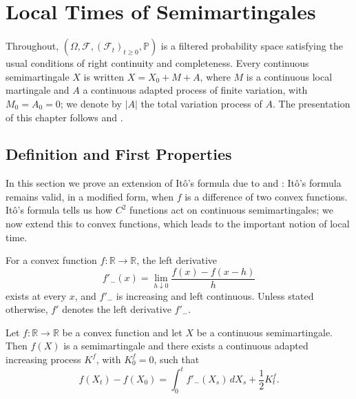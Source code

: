 \chapter{Local Times of Semimartingales}

Throughout, $(\Omega, \mathcal{F}, (\mathcal{F}_t)_{t\geqslant 0}, \mathbb{P})$
is a filtered probability space satisfying the usual conditions of right
continuity and completeness. Every continuous semimartingale $X$ is written
$X = X_0 + M + A$, where $M$ is a continuous local martingale and $A$ a
continuous adapted process of finite variation, with $M_0 = A_0 = 0$; we
denote by $|A|$ the total variation process of $A$. The presentation of this
chapter follows \citet{Durrett1996} and \citet[Chapter~VI]{RevuzYor1999}.

\section{Definition and First Properties}

In this section we prove an extension of It\^o's formula due to
\citet{Tanaka1963} and \citet{Meyer1976}: It\^o's formula remains valid, in a
modified form, when $f$ is a difference of two convex functions. It\^o's
formula tells us how $C^2$ functions act on continuous semimartingales; we
now extend this to convex functions, which leads to the important notion of
local time.

For a convex function $f:\mathbb{R}\to\mathbb{R}$, the left derivative
\[
	f'_-(x) = \lim_{h\downarrow 0} \frac{f(x)-f(x-h)}{h}
\]
exists at every $x$, and $f'_-$ is increasing and left continuous. Unless
stated otherwise, $f'$ denotes the left derivative $f'_-$.

\begin{theorem}\label{th1}
	Let $f:\mathbb{R}\to\mathbb{R}$ be a convex function and let $X$ be a
	continuous semimartingale. Then $f(X)$ is a semimartingale and there
	exists a continuous adapted increasing process $K^f$, with $K^f_0 = 0$,
	such that
	\[
		f(X_t)-f(X_0)=\int_0^t f'_-(X_s)\,dX_s +\frac{1}{2} K_t^f .
	\]
\end{theorem}

